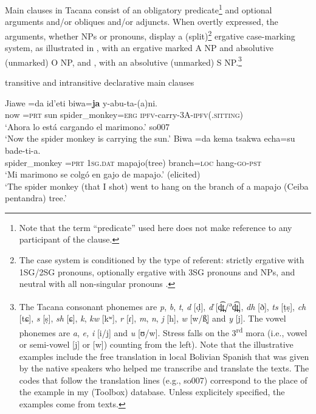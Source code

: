 \documentclass[output=paper,draft,draftmode,colorlinks,citecolor=brown]{langscibook}
\begin{document}
Main clauses in Tacana consist of an obligatory predicate\footnote{Note that the term ``predicate'' used here does not make
    reference to any participant of the clause.} 
and optional arguments and\slash or obliques
and\slash or adjuncts. When overtly expressed, the arguments, whether NPs
or pronouns, display a (split)\footnote{The case system is conditioned by the type of referent:
    strictly ergative with 1SG\slash 2SG pronouns, optionally ergative
    with 3SG pronouns and NPs, and neutral with all non-singular
    pronouns \parencites{Guillaume2016b}{Guillaume-forthcoming}.} 
ergative case-marking system, as illustrated in , with an ergative
marked A NP and absolutive (unmarked) O NP, and
, with an
absolutive (unmarked) S NP.\footnote{\label{fn:tacana-phonemes}The Tacana consonant phonemes are
\textit{p}, \textit{b}, \textit{t}, \textit{d} [ḍ], \textit{ď}
[d̪͡t̪/\textsuperscript{ə}d̪͡t̪], \textit{dh}
[ð], \textit{ts} [ṭṣ], \textit{ch} [tɕ],
\textit{s} [ṣ], \textit{sh} [ɕ], \textit{k}, \textit{kw}
[kʷ], \textit{r} [ɾ], \textit{m}, \textit{n},
\textit{j} [h], \textit{w} [w/ß̞] and \textit{y} [j]. The vowel
phonemes are \textit{a}, \textit{e,} \textit{i} [i/j] and \textit{u}
[ʊ/w]. Stress falls on the 3\textsuperscript{rd} mora (i.e., vowel
or semi-vowel [j] or [w]) counting from the left). Note that the
illustrative examples include the free translation in local Bolivian
Spanish that was given by the native speakers who helped me transcribe and
translate the texts. The codes that follow the translation lines (e.g.,
so007) correspond to the place of the example in my (Toolbox) database.
Unless explicitely specified, the examples come from texts.}

\begin{exe}\ex\label{ex:tacana-monkey-sun-branch} transitive and intransitive declarative main clauses
    \begin{xlist}
    \ex\label{ex:tacana-monkey-sun}
    \gll Jiawe	=da	id'eti	biwa=\textbf{ja}	y-abu-ta-(a)ni.\\
    now	=\textsc{prt}	sun	spider\_monkey=\textsc{erg}	\textsc{ipfv}-carry-3A-\textsc{ipfv(.sitting)}\\
    \glt `Ahora lo está cargando el marimono.' so007\\
    `Now the spider monkey is carrying the sun.’ 
    \ex\label{ex:tacana-monkey-branch}
    \gll {}Biwa	=da	kema	{\ob}tsakwa	echa=su{\cb}	bade-ti-a.\\
    spider\_monkey	=\textsc{prt}	\textsc{1sg.dat}	mapajo(tree)	branch=\textsc{loc}	hang-\textsc{go}-\textsc{pst}\\
    \glt ‘Mi marimono se colgó en gajo de mapajo.’ (elicited)\\
    ‘The spider monkey (that I shot) went to hang on the branch of a mapajo (Ceiba pentandra) tree.’
    \end{xlist}\end{exe}
\end{document}

